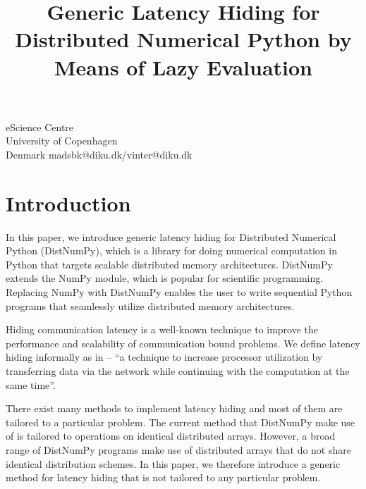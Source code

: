\documentclass[preprint]{../PGAS10/sigplanconf}
\begin{document}


\title{Generic Latency Hiding for Distributed Numerical Python by Means of Lazy Evaluation}

           {eScience Centre\\ University of Copenhagen\\ Denmark}
           {madsbk@diku.dk/vinter@diku.dk}

\maketitle

\begin{abstract}

\end{abstract}

\section{Introduction}
In this paper, we introduce generic latency hiding for Distributed Numerical Python (DistNumPy)\cite{kristensen10_dnumpy}, which is a library for doing numerical computation in Python that targets scalable distributed memory architectures. DistNumPy extends the NumPy module\cite{numpy}, which is popular for scientific programming. Replacing NumPy with DistNumPy enables the user to write sequential Python programs that seamlessly utilize distributed memory architectures.

Hiding communication latency is a well-known technique to improve the performance and scalability of communication bound problems. We define latency hiding informally as in \cite{Strumpen94latencyhiding} -- ``a technique to increase processor utilization by transferring data via the network while continuing with the computation at the same time''.

There exist many methods to implement latency hiding and most of them are tailored to a particular problem. The current method that DistNumPy make use of is tailored to operations on identical distributed arrays. However, a broad range of DistNumPy programs make use of distributed arrays that do not share identical distribution schemes. In this paper, we therefore introduce a generic method for latency hiding that is not tailored to any particular problem.
\end{document}

